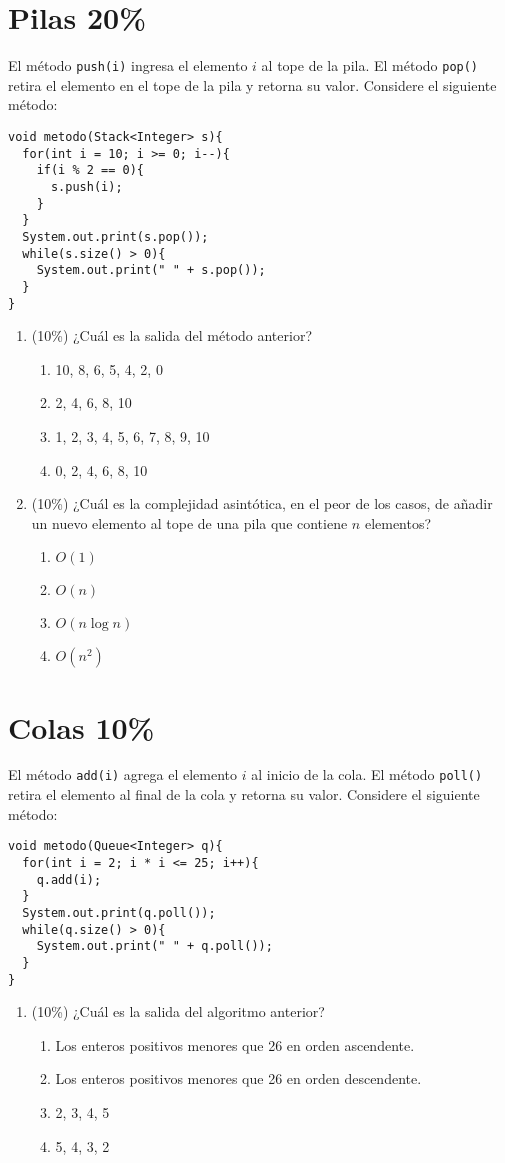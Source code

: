 \documentclass[10 pt]{article}
\begin{document}
\begin{multicols}{2}
\section{Pilas 20\%}
El método \texttt{push(i)} ingresa el elemento $i$ al tope de la pila. El método \texttt{pop()} retira
el elemento en el tope de la pila y retorna su valor. Considere el siguiente método:
\begin{lstlisting}
void metodo(Stack<Integer> s){
  for(int i = 10; i >= 0; i--){
    if(i % 2 == 0){
      s.push(i);    
    }  
  }
  System.out.print(s.pop());
  while(s.size() > 0){
    System.out.print(" " + s.pop());  
  }
}
\end{lstlisting}
\begin{enumerate}[label=\alph*]
\item (10\%) ¿Cuál es la salida del método anterior?
\begin{enumerate}[label=(\roman*)]
\item 10, 8, 6, 5, 4, 2, 0
\item 2, 4, 6, 8, 10
\item 1, 2, 3, 4, 5, 6, 7, 8, 9, 10
\item 0, 2, 4, 6, 8, 10
\end{enumerate}
\item (10\%) ¿Cuál es la complejidad asintótica, en el peor de los casos, de añadir un nuevo elemento al tope de una pila que contiene $n$ elementos?
\begin{enumerate}[label=(\roman*)]
\item $O(1)$
\item $O(n)$
\item $O(n \log n)$
\item $O(n^2)$
\end{enumerate}
\end{enumerate}
\section{Colas 10\%}
El método \texttt{add(i)} agrega el elemento $i$ al inicio de la cola. El método \texttt{poll()} retira el elemento al final de la cola y retorna su valor. Considere el siguiente método:
\begin{lstlisting}
void metodo(Queue<Integer> q){
  for(int i = 2; i * i <= 25; i++){
    q.add(i);  
  }
  System.out.print(q.poll());
  while(q.size() > 0){
    System.out.print(" " + q.poll());
  }
}
\end{lstlisting}
\begin{enumerate}[label=\alph*]
\item (10\%) ¿Cuál es la salida del algoritmo anterior?
\begin{enumerate}[label=(\roman*)]
\item Los enteros positivos menores que 26 en orden ascendente.
\item Los enteros positivos menores que 26 en orden descendente.
\item 2, 3, 4, 5
\item 5, 4, 3, 2
\end{enumerate}


\end{enumerate}
\end{multicols}
\end{document}
